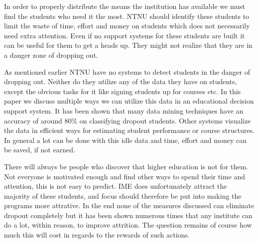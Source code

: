 \bigskip\noindent
In order to properly distribute the means the institution has available we must find the students who need it the most.
NTNU should identify these students to limit the waste of time, effort and money on students which does not necessarily need extra attention.
Even if no support systems for these students are built it can be useful for them to get a heads up.
They might not realize that they are in a danger zone of dropping out.

\bigskip\noindent
As mentioned earlier NTNU have no systems to detect students in the danger of dropping out.
Neither do they utilize any of the data they have on students, except the obvious tasks for it like signing students up for courses etc. 
In this paper we discuss multiple ways we can utilize this data in an educational decision support system.
It has been shown that many data mining techniques have an accuracy of around 80\% on classifying dropout students.
Other systems visualize the data in efficient ways for estimating student performance or course structures. 
In general a lot can be done with this idle data and time, effort and money can be saved, if not earned.

\bigskip\noindent
There will always be people who discover that higher education is not for them.
Not everyone is motivated enough and find other ways to spend their time and attention, this is not easy to predict.%
IME does unfortunately attract the majority of these students, and focus should therefore be put into making the programs more attrative. 
In the end none of the measures discussed can eliminate dropout completely but it has been shown numerous times that any institute can do a lot, within reason, to improve attrition. 
The question remains of course how much this will cost in regards to the rewards of such actions.